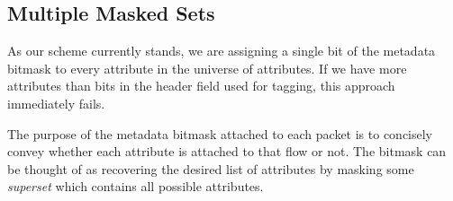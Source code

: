 \subsection{Multiple Masked Sets}
\label{ssec:mset}

 As our scheme currently stands, we are assigning a single bit of the metadata
 bitmask to every attribute in the universe of attributes. If we have more
 attributes than bits in the header field used for tagging, this approach
 immediately fails.

The purpose of the metadata bitmask attached to each packet is to concisely
convey whether each attribute is attached to that flow or not. The bitmask can
be thought of as recovering the desired list of attributes by masking some
\textit{superset} which contains all possible attributes. 

